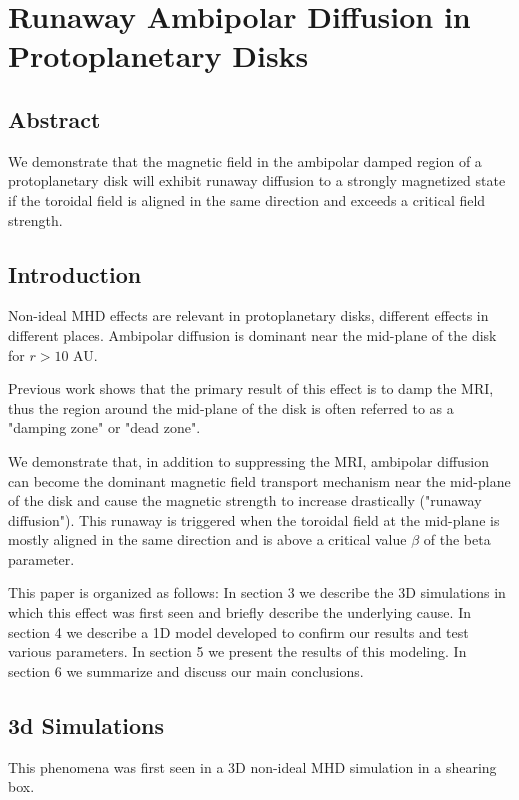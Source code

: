 \chapter{Runaway Ambipolar Diffusion in Protoplanetary Disks}
\label{1dvertical}





\section{Abstract}
We demonstrate that the magnetic field in the ambipolar damped region of a protoplanetary disk will exhibit runaway diffusion to a strongly magnetized state if the toroidal field is aligned in the same direction and exceeds a critical field strength.





\section{Introduction} 
Non-ideal MHD effects are relevant in protoplanetary disks, different effects in different places.  Ambipolar diffusion is dominant near the mid-plane of the disk for $r>10$ AU.  

Previous work shows that the primary result of this effect is to damp the MRI, thus the region around the mid-plane of the disk is often referred to as a "damping zone" or "dead zone".  

We demonstrate that, in addition to suppressing the MRI, ambipolar diffusion can become the dominant magnetic field transport mechanism near the mid-plane of the disk and cause the magnetic strength to increase drastically ("runaway diffusion").  This runaway is triggered when the toroidal field at the mid-plane is mostly aligned in the same direction and is above a critical value $\beta$ of the beta parameter. 

This paper is organized as follows: In section 3 we describe the 3D simulations in which this effect was first seen and briefly describe the underlying cause.  In section 4 we describe a 1D model developed to confirm our results and test various parameters.  In section 5 we present the results of this modeling.  In section 6 we summarize and discuss our main conclusions.  





\section{3d Simulations}
This phenomena was first seen in a 3D non-ideal MHD simulation in a shearing box.


